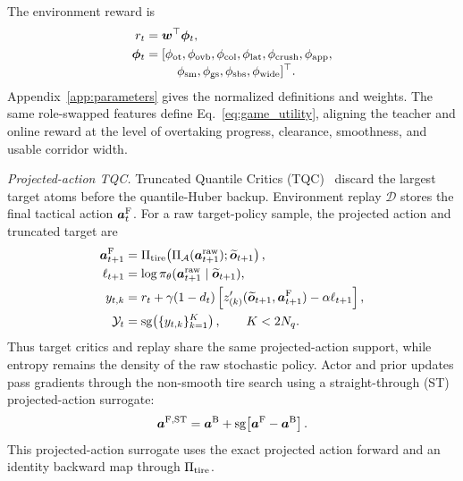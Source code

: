 \documentclass[journal,twoside,web]{ieeecolor}
\begin{document}
The environment reward is
\begin{equation}
\begin{aligned}
r_t&=\bm w^\top\bm\phi_t,\\
\bm\phi_t&=[\phi_{\rm ot},\phi_{\rm ovb},\phi_{\rm col},\phi_{\rm lat},
\phi_{\rm crush},\phi_{\rm app},\\[-1mm]
&\hspace{9mm}\phi_{\rm sm},\phi_{\rm gs},\phi_{\rm sbs},
\phi_{\rm wide}]^\top .
\end{aligned}
\label{eq:reward_sum}
\end{equation}
Appendix~\ref{app:parameters} gives the normalized definitions and weights.
The same role-swapped features define Eq.~\eqref{eq:game_utility}, aligning the
teacher and online reward at the level of overtaking progress, clearance,
smoothness, and usable corridor width.

\emph{Projected-action TQC.} Truncated Quantile Critics
(TQC)~\cite{kuznetsov2020tqc} discard the largest
target atoms before the quantile-Huber backup. Environment replay $\mathcal D$
stores the final tactical action $\bm a_t^{\rm F}$. For a raw target-policy
sample, the projected action and truncated target are
\begin{equation}
\begin{aligned}
\bm a_{t+1}^{\rm F}&=\Pi_{\rm tire}\!\left(
\Pi_{\mathcal A}(\bm a_{t+1}^{\rm raw});
\widetilde{\bm o}_{t+1}\right),\\
\ell_{t+1}&=\log\pi_\theta(\bm a_{t+1}^{\rm raw}
\mid\widetilde{\bm o}_{t+1}),\\
y_{t,k}&=r_t+\gamma(1-d_t)
\left[z_{(k)}'(\widetilde{\bm o}_{t+1},\bm a_{t+1}^{\rm F})
-\alpha\ell_{t+1}\right],\\
\mathcal Y_t&=\operatorname{sg}\!\left(\{y_{t,k}\}_{k=1}^{K}\right),
\qquad K<2N_q .
\end{aligned}
\label{eq:tqc_truncated_target}
\end{equation}
Thus target critics and replay share the same projected-action support, while
entropy remains the density of the raw stochastic policy. Actor and prior
updates pass gradients through the non-smooth tire search using a
straight-through (ST) projected-action surrogate:
\begin{equation}
\bm a^{\rm F,ST}=\bm a^{\rm B}
+\operatorname{sg}\!\left[\bm a^{\rm F}-\bm a^{\rm B}\right].
\label{eq:tire_projection_ste}
\end{equation}
This projected-action surrogate uses the exact projected action forward and an
identity backward map through $\Pi_{\rm tire}$.
\end{document}
